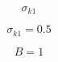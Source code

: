 

\begin{equation}
\sigma_{k 1}
\end{equation}

\begin{equation}
\sigma_{k 1} = 0.5
\end{equation}

\begin{equation}
B=1
\end{equation}


